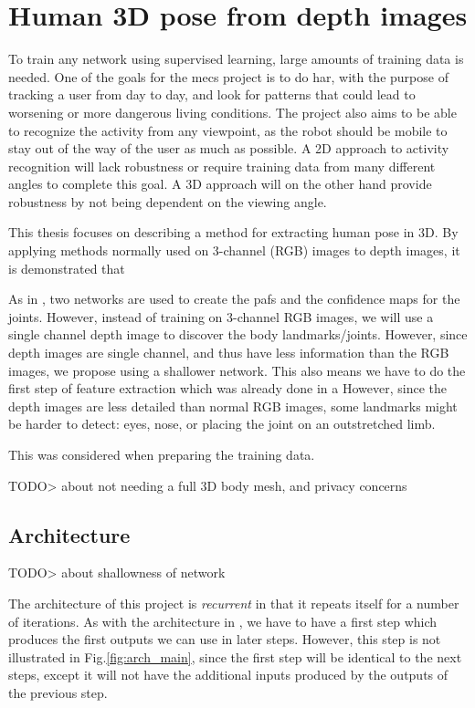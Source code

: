 \chapter{Human 3D pose from depth images}

To train any network using supervised learning, large amounts of training data is needed. One of the goals for the \gls{mecs} project is to do \gls{har}, with the purpose of tracking a user from day to day, and look for patterns that could lead to worsening or more dangerous living conditions. The project also aims to be able to recognize the activity from any viewpoint, as the robot should be mobile to stay out of the way of the user as much as possible. A 2D approach to activity recognition will lack robustness or require training data from many different angles to complete this goal. A 3D approach will on the other hand provide robustness by not being dependent on the viewing angle.

This thesis focuses on describing a method for extracting human pose in 3D. By applying methods normally used on 3-channel (RGB) images to depth images, it is demonstrated that 

As in \cite{cao2017realtime}, two networks are used to create the \gls{paf}s and the confidence maps for the joints. However, instead of training on 3-channel RGB images, we will use a single channel depth image to discover the body landmarks/joints.
However, since depth images are single channel, and thus have less information than the RGB images, we propose using a shallower network. This also means we have to do the first step of feature extraction which was already done in a
However, since the depth images are less detailed than normal RGB images, some landmarks might be harder to detect: eyes, nose, or placing the joint on an outstretched limb.

This was considered when preparing the training data.

TODO> about not needing a full 3D body mesh, and privacy concerns



\section{Architecture}

TODO> about shallowness of network

The architecture of this project is \emph{recurrent} in that it repeats itself for a number of iterations. As with the architecture in \cite{cao2017realtime}, we have to have a first step which produces the first outputs we can use in later steps. However, this step is not illustrated in Fig.\ref{fig:arch_main}, since the first step will be identical to the next steps, except it will not have the additional inputs produced by the outputs of the previous step.

